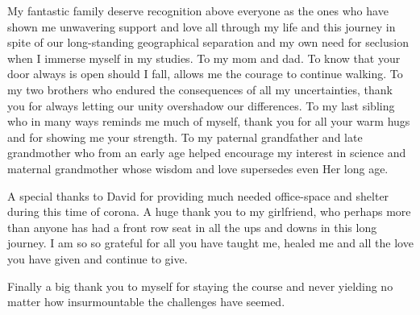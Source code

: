 My fantastic family deserve recognition above everyone as the ones who have shown me unwavering support and love all
through my life and this journey in spite of our long-standing geographical separation and my own need for seclusion
when I immerse myself in my studies. To my mom and dad. To know that your door always is open should I fall, allows me
the courage to continue walking. To my two brothers who endured the consequences of all my uncertainties, thank you for
always letting our unity overshadow our differences. To my last sibling who in many ways reminds me much of myself,
thank you for all your warm hugs and for showing me your strength. To my paternal grandfather and late grandmother
who from an early age helped encourage my interest in science and maternal grandmother whose wisdom and love supersedes even
Her long age.

A special thanks to David for providing much needed office-space and shelter during this time of corona.
A huge thank you to my girlfriend, who perhaps more than anyone has had a front row seat in all the ups and downs
in this long journey. I am so so grateful for all you have taught me, healed me and all the love you have given and continue to give.

Finally a big thank you to myself for staying the course and never yielding no matter how insurmountable the challenges
have seemed.
